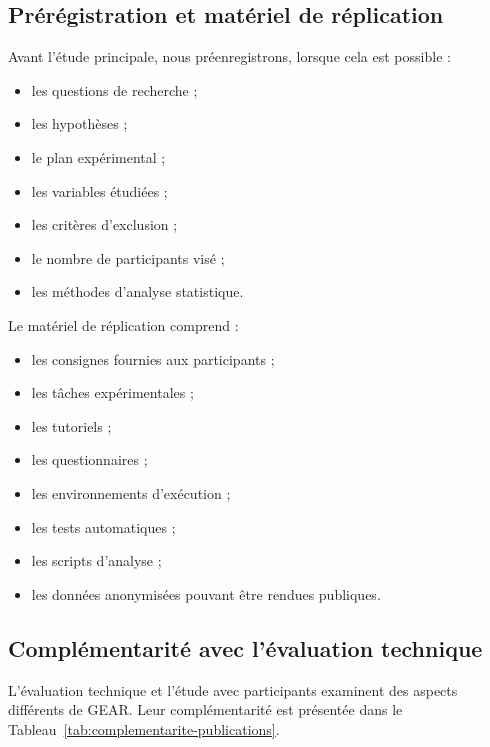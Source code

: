 \subsection{Prérégistration et matériel de réplication}
\label{subsec:preregistration-replication}

Avant l'étude principale, nous préenregistrons, lorsque cela est
possible :

\begin{itemize}
    \item les questions de recherche ;
    \item les hypothèses ;
    \item le plan expérimental ;
    \item les variables étudiées ;
    \item les critères d'exclusion ;
    \item le nombre de participants visé ;
    \item les méthodes d'analyse statistique.
\end{itemize}

Le matériel de réplication comprend :

\begin{itemize}
    \item les consignes fournies aux participants ;
    \item les tâches expérimentales ;
    \item les tutoriels ;
    \item les questionnaires ;
    \item les environnements d'exécution ;
    \item les tests automatiques ;
    \item les scripts d'analyse ;
    \item les données anonymisées pouvant être rendues publiques.
\end{itemize}


\subsection{Complémentarité avec l'évaluation technique}
\label{subsec:complementarite-evaluations}

L'évaluation technique et l'étude avec participants examinent des
aspects différents de GEAR. Leur complémentarité est présentée dans le
Tableau~\ref{tab:complementarite-publications}.

